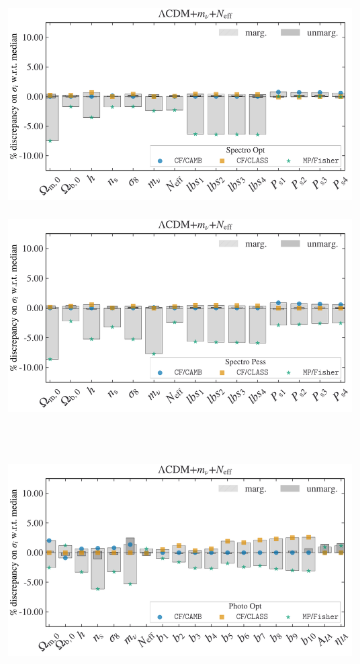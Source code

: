 \documentclass[oneside]{book}
\newcommand*{\neff}{N_\mathrm{eff}}
\begin{document}
\begin{figure}
    \centering
    \caption{Same as figure \ref{fig:Comparison_w0wa} but for the $\Lambda$CDM+$m_\nu+\neff$ model}
    \begin{subfigure}[b]{0.49\textwidth}
        \centering
        \includegraphics[width=\textwidth]{Spectro_Opt_mnu+Neff_error_comparison.pdf}
    \end{subfigure}
    \hfill
    \begin{subfigure}[b]{0.49\textwidth}
        \centering
        \includegraphics[width=\textwidth]{Spectro_Pess_mnu+Neff_error_comparison.pdf}
    \end{subfigure}\\
    \begin{subfigure}[b]{0.49\textwidth}
        \centering
        \includegraphics[width=\textwidth]{Photo_Opt_mnu+Neff_error_comparison.pdf}

\end{subfigure}
\end{figure}
\end{document}

